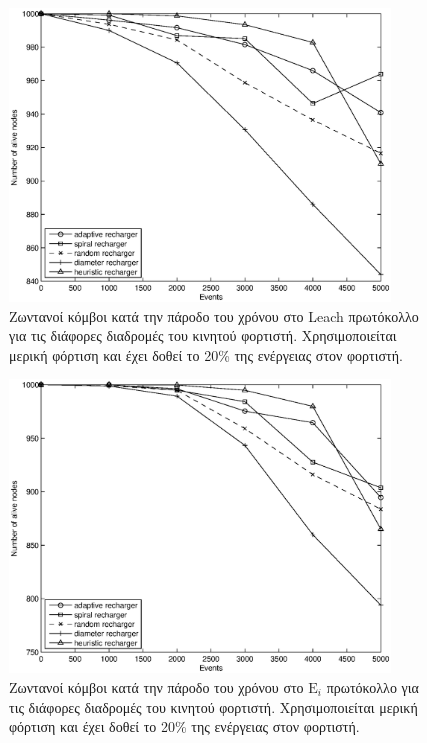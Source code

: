 \begin{figure}[H]
  \centering
  \includegraphics[width=0.9\textwidth]{experiments/classic/4.ourVSnaive/alive_nodes_leach_rc_per_our-spiral-random-diameter-heuristic.eps}
  \caption{Ζωντανοί κόμβοι κατά την πάροδο του χρόνου στο Leach πρωτόκολλο για τις διάφορες διαδρομές του κινητού φορτιστή. Χρησιμοποιείται μερική φόρτιση και έχει
δοθεί το 20\% της ενέργειας στον φορτιστή.}
  \label{fig:4exp_1_2}
\end{figure}

\begin{figure}[H]
  \centering
  \includegraphics[width=0.9\textwidth]{experiments/classic/4.ourVSnaive/alive_nodes_ei_rc_per_our-spiral-random-diameter-heuristic.eps}
  \caption{Ζωντανοί κόμβοι κατά την πάροδο του χρόνου στο $\text{E}_{i}$ πρωτόκολλο για τις διάφορες διαδρομές του κινητού φορτιστή. Χρησιμοποιείται μερική φόρτιση
και έχει δοθεί το 20\% της ενέργειας στον φορτιστή.}
  \label{fig:4exp_1_3}
\end{figure}



